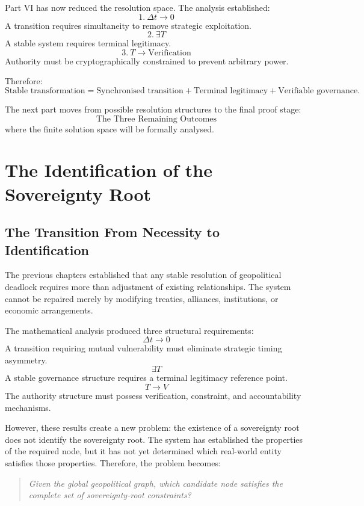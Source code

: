 \documentclass[11pt,openany]{book}
\theoremstyle{plain}
\theoremstyle{definition}
\begin{document}
Part VI has now reduced the resolution space. The analysis established:
\[
\boxed{
1. \ \Delta t \to 0
}
\]
A transition requires simultaneity to remove strategic exploitation.
\[
\boxed{
2. \ \exists T
}
\]
A stable system requires terminal legitimacy.
\[
\boxed{
3. \ T \longrightarrow \text{Verification}
}
\]
Authority must be cryptographically constrained to prevent arbitrary power.

Therefore:
\[
\boxed{
\text{Stable transformation} = \text{Synchronised transition} + \text{Terminal legitimacy} + \text{Verifiable governance}.
}
\]

The next part moves from possible resolution structures to the final proof stage:
\[
\boxed{
\text{The Three Remaining Outcomes}
}
\]
where the finite solution space will be formally analysed.

\chapter{The Identification of the Sovereignty Root}

\section*{The Transition From Necessity to Identification}

The previous chapters established that any stable resolution of geopolitical deadlock requires more than adjustment of existing relationships. The system cannot be repaired merely by modifying treaties, alliances, institutions, or economic arrangements.

The mathematical analysis produced three structural requirements:
\[
\boxed{
\Delta t \to 0
}
\]
A transition requiring mutual vulnerability must eliminate strategic timing asymmetry.
\[
\boxed{
\exists T
}
\]
A stable governance structure requires a terminal legitimacy reference point.
\[
\boxed{
T \longrightarrow V
}
\]
The authority structure must possess verification, constraint, and accountability mechanisms.

However, these results create a new problem: the existence of a sovereignty root does not identify the sovereignty root. The system has established the properties of the required node, but it has not yet determined which real-world entity satisfies those properties. Therefore, the problem becomes:
\begin{quote}
\textit{Given the global geopolitical graph, which candidate node satisfies the complete set of sovereignty-root constraints?}
\end{quote}
\end{document}
